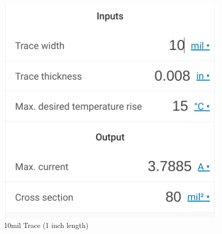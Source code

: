 \documentclass[a4paper,11pt]{article}%
\begin{document}
\begin{figure}[H]
\begin{minipage}[b]{0.45\linewidth}
		\includegraphics[scale=0.4]{figures/10_c}
		\caption{10mil Trace (1 inch length) }
	\end{minipage}
	\end{figure}\hspace{1cm}
	
\end{document}
